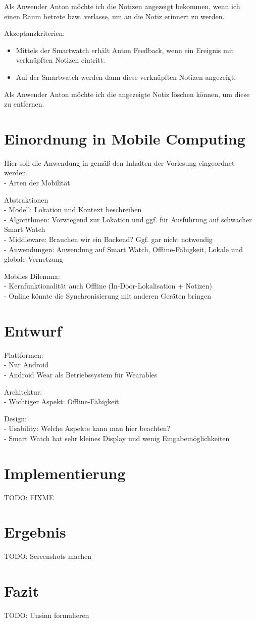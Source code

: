 Als Anwender Anton möchte ich die Notizen angezeigt bekommen, wenn ich einen Raum betrete bzw. verlasse, um an die Notiz erinnert zu werden.

Akzeptanzkriterien:
\begin{itemize}
\item Mittels der Smartwatch erhält Anton Feedback, wenn ein Ereignis mit verknüpften Notizen eintritt.
\item Auf der Smartwatch werden dann diese verknüpften Notizen angezeigt.
\end{itemize}

Als Anwender Anton möchte ich die angezeigte Notiz löschen können, um diese zu entfernen.


\section{Einordnung in Mobile Computing}
Hier soll die Anwendung in gemäß den Inhalten der Vorlesung eingeordnet werden.
\\- Arten der Mobilität

Abstraktionen
\\- Modell: Lokation und Kontext beschreiben
\\- Algorithmen: Vorwiegend zur Lokation und ggf. für Ausführung auf schwacher Smart Watch
\\- Middleware: Brauchen wir ein Backend? Ggf. gar nicht notwendig
\\- Anwendungen: Anwendung auf Smart Watch, Offline-Fähigkeit, Lokale und globale Vernetzung

Mobiles Dilemma:
\\- Kernfunktionalität auch Offline (In-Door-Lokalisation + Notizen)
\\- Online könnte die Synchronisierung mit anderen Geräten bringen

\section{Entwurf}
Plattformen:
\\- Nur Android
\\- Android Wear als Betriebssystem für Wearables

Architektur:
\\- Wichtiger Aspekt: Offline-Fähigkeit

Design:
\\- Usability: Welche Aspekte kann man hier beachten?
\\- Smart Watch hat sehr kleines Display und wenig Eingabemöglichkeiten

\section{Implementierung}
TODO: FIXME

\section{Ergebnis}
TODO: Screenshots machen

\section{Fazit}
TODO: Unsinn formulieren


\appendix


\newpage

